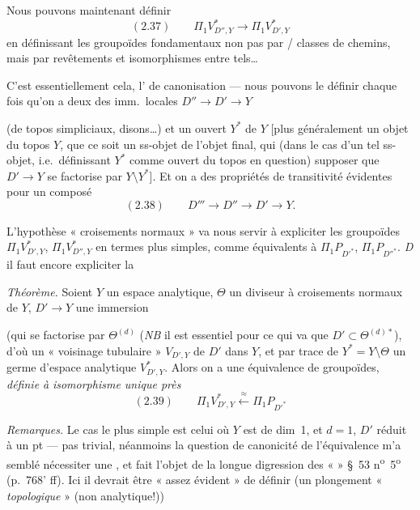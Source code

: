 \documentclass[11pt,a4paper]{article}
\begin{document}
Nous pouvons maintenant définir
\[
(2.37)\qquad \Pi_1 V^*_{D'',Y}\longrightarrow \Pi_1 V^*_{D',Y}
\]
en définissant les groupoïdes fondamentaux non pas par   / classes de chemins, mais par revêtements et isomorphismes entre tels\ldots

C'est essentiellement cela, l' de canonisation — nous pouvons le définir chaque fois qu'on a deux des imm.\ locales $D''\to D'\to Y$

(de topos simpliciaux, disons\ldots) et un ouvert $Y^*$ de $Y$ [plus généralement un objet du topos  $Y$,  que ce soit un ss-objet de l'objet final, qui (dans le cas d'un tel ss-objet, i.e.\ définissant $Y^*$ comme ouvert du topos en question)  supposer que $D'\to Y$ se factorise par $Y\setminus Y^*$]. Et on a des propriétés de transitivité \ill{} évidentes pour un composé
\[
(2.38)\qquad D'''\to D''\to D'\to Y .
\]

L'hypothèse « croisements normaux » va nous servir à expliciter les groupoïdes $\Pi_1 V^*_{D',Y}$, $\Pi_1 V^*_{D'',Y}$ en termes plus simples, comme  équivalents à $\Pi_1 P_{D'^*}$, $\Pi_1 P_{D''^*}$. \emph{D}\ill{} il faut encore  expliciter la

\emph{Théorème.} Soient $Y$ un espace analytique, $\Theta$ un diviseur à croisements normaux de $Y$, $D'\to Y$ \struck{\ill{}} une immersion

 (qui se factorise par $\Theta^{(d)}$ (\emph{NB} il est essentiel pour ce qui va  \ill{} que $D'\subset\Theta^{(d)*}$), \struck{\ill{}} d'où un « voisinage tubulaire » $V_{D',Y}$ \struck{$*$} de $D'$ dans $Y$, et par trace de $Y^*=Y\setminus\Theta$ un \struck{\ill{}} germe d'espace analytique $V^*_{D',Y}$. Alors on a une équivalence de groupoïdes, \emph{définie à}  \emph{isomorphisme unique près}
\[
(2.39)\qquad \Pi_1 V^*_{D',Y}\xleftarrow{\ \approx\ }\Pi_1 P_{D'^*}
\]

\emph{Remarques.} Le cas le plus simple est celui où $Y$ est de dim~1, et $d=1$, $D'$ réduit à un pt —  pas  trivial, néanmoins la question de canonicité de l'équivalence m'a semblé nécessiter une \ill{}, et fait l'objet de la longue digression des «  » §~53 n\textsuperscript{o}~5\textsuperscript{o} (p.~768' ff). Ici  il devrait être « assez évident » de définir  (un plongement « \emph{topologique} »  (non analytique!))
\end{document}
